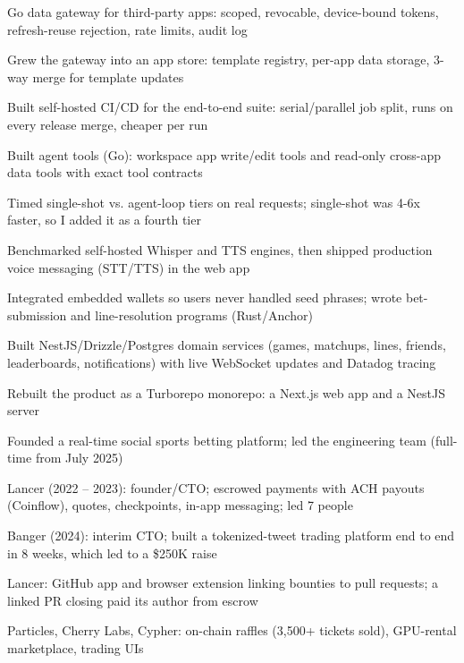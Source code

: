 \documentclass[print]{jack-resume}
\begin{document}
\begin{tightemize}
    \item Go data gateway for third-party apps: scoped, revocable, device-bound tokens, refresh-reuse rejection, rate limits, audit log
    \item Grew the gateway into an app store: template registry, per-app data storage, 3-way merge for template updates
    \item Built self-hosted CI/CD for the end-to-end suite: serial/parallel job split, runs on every release merge, cheaper per run
    \item Built agent tools (Go): workspace app write/edit tools and read-only cross-app data tools with exact tool contracts
    \item Timed single-shot vs. agent-loop tiers on real requests; single-shot was 4-6x faster, so I added it as a fourth tier
    \item Benchmarked self-hosted Whisper and TTS engines, then shipped production voice messaging (STT/TTS) in the web app
\end{tightemize}
\sectionsep

\begin{tightemize}
    \item Integrated embedded wallets so users never handled seed phrases; wrote bet-submission and line-resolution programs (Rust/Anchor)
    \item Built NestJS/Drizzle/Postgres domain services (games, matchups, lines, friends, leaderboards, notifications) with live WebSocket updates and Datadog tracing
    \item Rebuilt the product as a Turborepo monorepo: a Next.js web app and a NestJS server
    \item Founded a real-time social sports betting platform; led the engineering team (full-time from July 2025)
\end{tightemize}
\sectionsep

\begin{tightemize}
    \item Lancer (2022 -- 2023): founder/CTO; escrowed payments with ACH payouts (Coinflow), quotes, checkpoints, in-app messaging; led 7 people
    \item Banger (2024): interim CTO; built a tokenized-tweet trading platform end to end in 8 weeks, which led to a \$250K raise
    \item Lancer: GitHub app and browser extension linking bounties to pull requests; a linked PR closing paid its author from escrow
    \item Particles, Cherry Labs, Cypher: on-chain raffles (3,500+ tickets sold), GPU-rental marketplace, trading UIs
\end{tightemize}
\sectionsep
\end{document}
